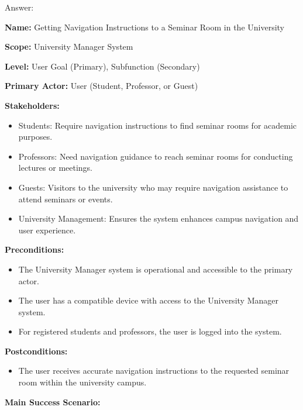 \documentclass[conference,onecolumn]{IEEEtran}
\begin{document}
Answer:
\begin{framed}
	\small
	\textbf{Name:} Getting Navigation Instructions to a Seminar Room in the University
	
	\textbf{Scope:} University Manager System
	
	\textbf{Level:} User Goal (Primary), Subfunction (Secondary)
	
	\textbf{Primary Actor:} User (Student, Professor, or Guest)
	
	\textbf{Stakeholders:}
	
	\begin{itemize}
		\item Students: Require navigation instructions to find seminar rooms for academic purposes.
		\item Professors: Need navigation guidance to reach seminar rooms for conducting lectures or meetings.
		\item Guests: Visitors to the university who may require navigation assistance to attend seminars or events.
		\item University Management: Ensures the system enhances campus navigation and user experience.
	\end{itemize}
	
	\textbf{Preconditions:}
	
	\begin{itemize}
		\item The University Manager system is operational and accessible to the primary actor.
		\item The user has a compatible device with access to the University Manager system.
		\item For registered students and professors, the user is logged into the system.
	\end{itemize}
	
	\textbf{Postconditions:}
	
	\begin{itemize}
		\item The user receives accurate navigation instructions to the requested seminar room within the university campus.
	\end{itemize}
	
	\textbf{Main Success Scenario:}
	

\end{framed}
\end{document}
